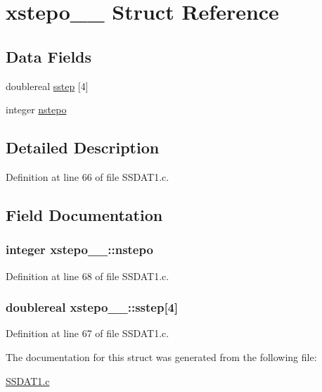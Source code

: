 \hypertarget{structxstepo__1__}{}\section{xstepo\+\_\+\_\+ Struct Reference}
\label{structxstepo__1__}
\subsection*{Data Fields}
\begin{DoxyCompactItemize}
\item 
doublereal \hyperlink{structxstepo__1___a24b0cec27650f4f43e36edce1df60353}{sstep} \mbox{[}4\mbox{]}
\item 
integer \hyperlink{structxstepo__1___af53cb95929e2ac661505ffdf84e88156}{nstepo}
\end{DoxyCompactItemize}


\subsection{Detailed Description}


Definition at line 66 of file S\+S\+D\+A\+T1.\+c.



\subsection{Field Documentation}
\subsubsection[{\texorpdfstring{nstepo}{nstepo}}]{\setlength{\rightskip}{0pt plus 5cm}integer xstepo\+\_\+\_\+\+::nstepo}\hypertarget{structxstepo__1___af53cb95929e2ac661505ffdf84e88156}{}\label{structxstepo__1___af53cb95929e2ac661505ffdf84e88156}


Definition at line 68 of file S\+S\+D\+A\+T1.\+c.

\subsubsection[{\texorpdfstring{sstep}{sstep}}]{\setlength{\rightskip}{0pt plus 5cm}doublereal xstepo\+\_\+\_\+\+::sstep\mbox{[}4\mbox{]}}\hypertarget{structxstepo__1___a24b0cec27650f4f43e36edce1df60353}{}\label{structxstepo__1___a24b0cec27650f4f43e36edce1df60353}


Definition at line 67 of file S\+S\+D\+A\+T1.\+c.



The documentation for this struct was generated from the following file\+:\begin{DoxyCompactItemize}
\item 
\hyperlink{SSDAT1_8c}{S\+S\+D\+A\+T1.\+c}\end{DoxyCompactItemize}
